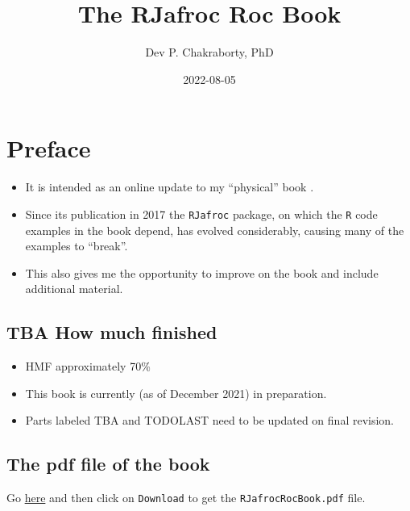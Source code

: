 \documentclass[
]{book}
\title{The RJafroc Roc Book}
\author{Dev P. Chakraborty, PhD}
\date{2022-08-05}
\providecommand{\tightlist}{%
  \setlength{\itemsep}{0pt}\setlength{\parskip}{0pt}}
\begin{document}
\maketitle

{
\setcounter{tocdepth}{1}
\tableofcontents
}
\hypertarget{preface}{%
\chapter*{Preface}\label{preface}}

\begin{itemize}
\tightlist
\item
  It is intended as an online update to my ``physical'' book \citep{chakraborty2017observer}.
\item
  Since its publication in 2017 the \texttt{RJafroc} package, on which the \texttt{R} code examples in the book depend, has evolved considerably, causing many of the examples to ``break''.
\item
  This also gives me the opportunity to improve on the book and include additional material.
\end{itemize}

\hypertarget{tba-how-much-finished}{%
\section*{TBA How much finished}\label{tba-how-much-finished}}

\begin{itemize}
\tightlist
\item
  HMF approximately 70\%
\item
  This book is currently (as of December 2021) in preparation.
\item
  Parts labeled TBA and TODOLAST need to be updated on final revision.
\end{itemize}

\hypertarget{the-pdf-file-of-the-book}{%
\section*{The pdf file of the book}\label{the-pdf-file-of-the-book}}

Go \href{https://github.com/dpc10ster/RJafrocRocBook/blob/gh-pages/RJafrocRocBook.pdf}{here} and then click on \texttt{Download} to get the \texttt{RJafrocRocBook.pdf} file.
\end{document}
